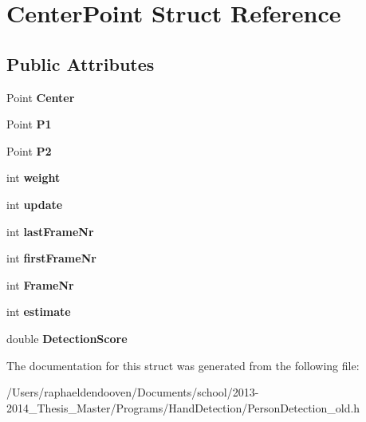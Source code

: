 \hypertarget{struct_center_point}{\section{Center\-Point Struct Reference}
\label{struct_center_point}
}
\subsection*{Public Attributes}
\begin{DoxyCompactItemize}
\item 
\hypertarget{struct_center_point_ae413940c08de0552f1de023b84cd640e}{Point {\bfseries Center}}\label{struct_center_point_ae413940c08de0552f1de023b84cd640e}

\item 
\hypertarget{struct_center_point_a8788e2195815bea38ddb58b42b5f9348}{Point {\bfseries P1}}\label{struct_center_point_a8788e2195815bea38ddb58b42b5f9348}

\item 
\hypertarget{struct_center_point_a59d6c7604886b684e049307258158e3f}{Point {\bfseries P2}}\label{struct_center_point_a59d6c7604886b684e049307258158e3f}

\item 
\hypertarget{struct_center_point_a063307e2f8f82c0e2c2d0d6f317207f4}{int {\bfseries weight}}\label{struct_center_point_a063307e2f8f82c0e2c2d0d6f317207f4}

\item 
\hypertarget{struct_center_point_afe861e746833163cf1f3d2b7ccab9721}{int {\bfseries update}}\label{struct_center_point_afe861e746833163cf1f3d2b7ccab9721}

\item 
\hypertarget{struct_center_point_abfd53681331d2457c0b51c55d7aae630}{int {\bfseries last\-Frame\-Nr}}\label{struct_center_point_abfd53681331d2457c0b51c55d7aae630}

\item 
\hypertarget{struct_center_point_a6c2432708d0704ac9e059102e68d6165}{int {\bfseries first\-Frame\-Nr}}\label{struct_center_point_a6c2432708d0704ac9e059102e68d6165}

\item 
\hypertarget{struct_center_point_a095fc62638dfc95b753aebe5e3b83a03}{int {\bfseries Frame\-Nr}}\label{struct_center_point_a095fc62638dfc95b753aebe5e3b83a03}

\item 
\hypertarget{struct_center_point_a399ff5fe10038332dec63f22f5e73164}{int {\bfseries estimate}}\label{struct_center_point_a399ff5fe10038332dec63f22f5e73164}

\item 
\hypertarget{struct_center_point_a3f3e95a167e7ba3b4062cbe8bd0ecf89}{double {\bfseries Detection\-Score}}\label{struct_center_point_a3f3e95a167e7ba3b4062cbe8bd0ecf89}

\end{DoxyCompactItemize}


The documentation for this struct was generated from the following file\-:\begin{DoxyCompactItemize}
\item 
/\-Users/raphaeldendooven/\-Documents/school/2013-\/2014\-\_\-\-Thesis\-\_\-\-Master/\-Programs/\-Hand\-Detection/Person\-Detection\-\_\-old.\-h\end{DoxyCompactItemize}
